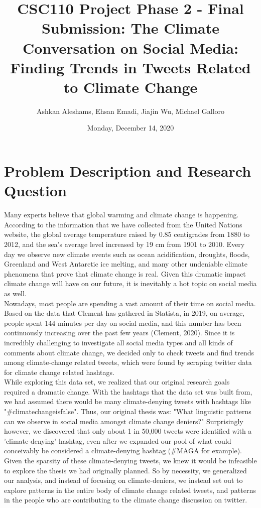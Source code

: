 \documentclass[fontsize=11pt]{article}
\title{CSC110 Project Phase 2 - Final Submission: The Climate Conversation on Social Media: Finding Trends in Tweets Related to Climate Change}
\author{Ashkan Aleshams, Ehsan Emadi, Jiajin Wu, Michael Galloro}
\date{Monday, December 14, 2020}
\begin{document}
\maketitle

\section*{Problem Description and Research Question} 

Many experts believe that global warming and climate change is happening. According to the information that we have collected from the United Nations website, the global average temperature raised by 0.85 centigrades from 1880 to 2012, and the sea's average level increased by 19 cm from 1901 to 2010. Every day we observe new climate events such as ocean acidification, droughts, floods, Greenland and West Antarctic ice melting, and many other undeniable climate phenomena that prove that climate change is real. Given this dramatic impact climate change will have on our future, it is inevitably a hot topic on social media as well. \\

Nowadays, most people are spending a vast amount of their time on social media. Based on the data that Clement has gathered in Statista, in 2019, on average, people spent 144 minutes per day on social media, and this number has been continuously increasing over the past few years (Clement, 2020). Since it is incredibly challenging to investigate all social media types and all kinds of comments about climate change, we decided only to check tweets and find trends among climate-change related tweets, which were found by scraping twitter data for climate change related hashtags.\\

While exploring this data set, we realized that our original research goals required a dramatic change. With the hashtags that the data set was built from, we had assumed there would be many climate-denying tweets with hashtags like "\#climatechangeisfalse". Thus, our original thesis was: "What linguistic patterns can we observe in social media amongst climate change deniers?" Surprisingly however, we discovered that only about 1 in 50,000 tweets were identified with a 'climate-denying' hashtag, even after we expanded our pool of what could conceivably be considered a climate-denying hashtag (\#MAGA for example). Given the sparsity of these climate-denying tweets, we knew it would be infeasible to explore the thesis we had originally planned. So by necessity, we generalized our analysis, and instead of focusing on climate-deniers, we instead set out to explore patterns in the entire body of climate change related tweets, and patterns in the people who are contributing to the climate change discussion on twitter. \\
\end{document}

